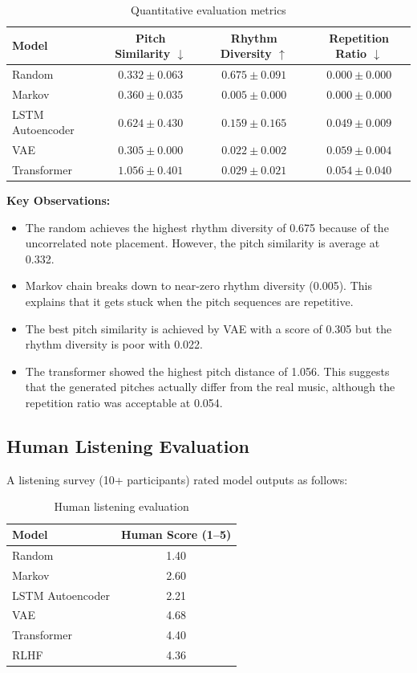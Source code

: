 \documentclass[conference]{IEEEtran}
\begin{document}
\begin{table}[t]
\caption{Quantitative evaluation metrics}
\label{tab:quant-metrics}
\centering
\begin{tabular}{lccc}
\toprule
Model & Pitch Similarity $\downarrow$ & Rhythm Diversity $\uparrow$ & Repetition Ratio $\downarrow$ \\
\midrule
Random & $0.332 \pm 0.063$ & $0.675 \pm 0.091$ & $0.000 \pm 0.000$ \\
Markov & $0.360 \pm 0.035$ & $0.005 \pm 0.000$ & $0.000 \pm 0.000$ \\
LSTM Autoencoder & $0.624 \pm 0.430$ & $0.159 \pm 0.165$ & $0.049 \pm 0.009$ \\
VAE & $0.305 \pm 0.000$ & $0.022 \pm 0.002$ & $0.059 \pm 0.004$ \\
Transformer & $1.056 \pm 0.401$ & $0.029 \pm 0.021$ & $0.054 \pm 0.040$ \\
\bottomrule
\end{tabular}
\end{table}

\textbf{Key Observations:}
\begin{itemize}
    \item The random achieves the highest rhythm diversity of 0.675 because of the uncorrelated note placement. However, the pitch similarity is average at 0.332.
    \item Markov chain breaks down to near-zero rhythm diversity (0.005). This explains that it gets stuck when the pitch sequences are repetitive.
    \item The best pitch similarity is achieved by VAE with a score of 0.305 but the rhythm diversity is poor with 0.022.
    \item The transformer showed the highest pitch distance of 1.056. This suggests that the generated pitches actually differ from the real music, although the repetition ratio was acceptable at 0.054.
\end{itemize}

\subsection{Human Listening Evaluation}

A listening survey (10+ participants) rated model outputs as follows:

\begin{table}[t]
\caption{Human listening evaluation}
\label{tab:human-score}
\centering
\begin{tabular}{lc}
\toprule
Model & Human Score (1--5) \\
\midrule
Random & 1.40 \\
Markov & 2.60 \\
LSTM Autoencoder & 2.21 \\
VAE & 4.68 \\
Transformer & 4.40 \\
RLHF & 4.36 \\
\bottomrule
\end{tabular}
\end{table}
\end{document}
